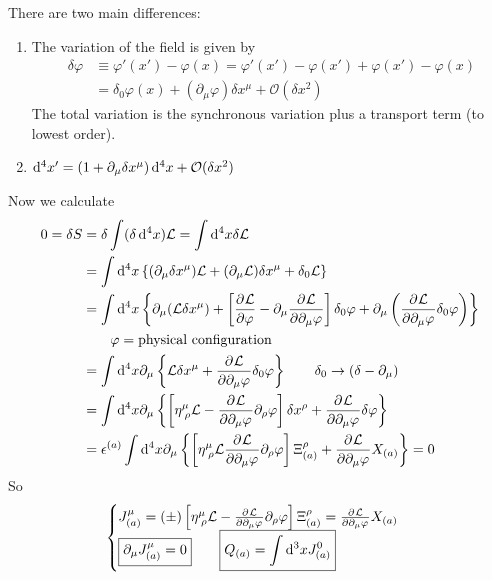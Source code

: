 There are two main differences:
\begin{enumerate}
\item The variation of the field is given by
\begin{align*}\delta \varphi &\equiv \varphi'(x') - \varphi(x) = \varphi'(x') - \varphi(x') + \varphi(x')-\varphi(x) \\
&= \delta_0 \varphi(x) + (\partial_\mu\varphi)\delta x^\mu + \mathcal{O}(\delta x^2)
\end{align*}
The total variation is the synchronous variation plus a transport term (to lowest order).
\item $\operatorname{d \!}{^4x'} = (1+\partial_\mu\delta x^\mu)\operatorname{d \!}{^4x} + \mathcal{O}(\delta x^2)$ 
\end{enumerate}
Now we calculate
\begin{align*}
0 = \delta S &= \delta\int (\delta\operatorname{d \!}{^4x})\mathcal{L} = \int \operatorname{d \!}{^4x}\delta \mathcal{L} \\
&= \int \operatorname{d \!}{^4x}\left\{(\partial_\mu\delta x^\mu)\mathcal{L} + (\partial_\mu\mathcal{L})\delta x^\mu + \delta_0\mathcal{L}\right\} \\
&= \int \operatorname{d \!}{^4x}\left\{\partial_\mu(\mathcal{L}\delta x^\mu) + \left[ \frac{\partial{^{}}\mathcal{L}}{\partial{{\varphi}^{}}} -\partial_\mu  \frac{\partial{^{}}\mathcal{L}}{\partial{{\partial_\mu\varphi}^{}}} \right]\delta_0\varphi + \partial_\mu \left( \frac{\partial{^{}}\mathcal{L}}{\partial{{\partial_\mu\varphi}^{}}} \delta_0 \varphi\right)\right\}\\
&\qquad \varphi = \text{physical configuration} \\
&= \int \operatorname{d \!}{^4x}\partial_\mu \left\{\mathcal{L}\delta x^\mu +  \frac{\partial{^{}}\mathcal{L}}{\partial{{\partial_\mu\varphi}^{}}} \delta_0\varphi\right\} \qquad \delta_0 \to (\delta - \partial_\mu) \\
&= \int \operatorname{d \!}{^4x} \partial_\mu \left\{\left[\eta^\mu_{\;\rho}\mathcal{L} -  \frac{\partial{^{}}\mathcal{L}}{\partial{{\partial_\mu\varphi}^{}}} \partial_\rho\varphi\right]\delta x^\rho +  \frac{\partial{^{}}\mathcal{L}}{\partial{{\partial_\mu\varphi}^{}}} \delta\varphi\right\} \\
&= \epsilon^{(a)} \int \operatorname{d \!}{^4x}\partial_\mu \left\{\left[\eta^\mu_{\;\rho}\mathcal{L}  \frac{\partial{^{}}\mathcal{L}}{\partial{{\partial_\mu\varphi}^{}}} \partial_\rho\varphi\right]\Xi^\rho_{(a)}+  \frac{\partial{^{}}\mathcal{L}}{\partial{{\partial_\mu\varphi}^{}}} X_{(a)}\right\} = 0
\end{align*}
So
\[ \begin{cases}
J^\mu_{(a)} = (\pm) \left[\eta^\mu_{\;\rho}\mathcal{L} -  \frac{\partial{^{}}\mathcal{L}}{\partial{{\partial_\mu\varphi}^{}}} \partial_\rho\varphi\right]\Xi^\rho_{(a)} =  \frac{\partial{^{}}\mathcal{L}}{\partial{{\partial_\mu\varphi}^{}}} X_{(a)} \\
\boxed{\partial_\mu J^\mu_{(a)} = 0} \qquad \boxed{Q_{(a)} = \int \operatorname{d \!}{^3x}J^0_{(a)}}
\end{cases} \]

